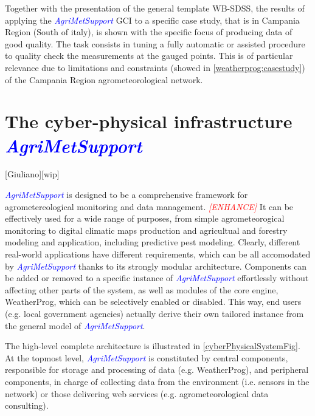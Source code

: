 \documentclass[authoryear,preprint,review,12pt]{elsarticle}
\newcommand{\note}[1]{\emph{\textcolor{red}{#1}}}
\newcommand{\update}[1]{\emph{\textcolor{blue}{#1}}}
\newcommand{\gci}{\update{AgriMetSupport}\xspace}
\begin{document}
Together with the presentation of the general template WB-SDSS, the results of applying the \gci GCI to a specific case study, that is in Campania Region (South of italy), is shown with the specific focus of producing data of good quality.
The task consists in tuning a fully automatic or assisted procedure to quality check the measurements at the gauged points.
This is of particular relevance due to limitations and constraints (showed in \cref{weatherprog:casestudy}) of the Campania Region agrometeorological network.

\section{The cyber-physical infrastructure \gci}[Giuliano][wip]

\gci is designed to be a comprehensive framework for agrometereological monitoring and data management.
\note{[ENHANCE]} It can be effectively used for a wide range of purposes, from simple agrometeorogical monitoring to digital climatic maps production and agricultual and forestry modeling and application, including predictive pest modeling.
Clearly, different real-world applications have different requirements, which can be all accomodated by \gci thanks to its strongly modular architecture.
Components can be added or removed to a specific instance of \gci effortlessly without affecting other parts of the system, as well as modules of the core engine, WeatherProg, which can be selectively enabled or disabled.
This way, end users (e.g. local government agencies) actually derive their own tailored instance from the general model of \gci.

The high-level complete architecture is illustrated in \cref{cyberPhysicalSystemFig}.
At the topmost level, \gci is constituted by central components, responsible for storage and processing of data (e.g. WeatherProg), and peripheral components, in charge of collecting data from the environment (i.e. sensors in the network) or those delivering web services (e.g. agrometeorological data consulting).
\end{document}
